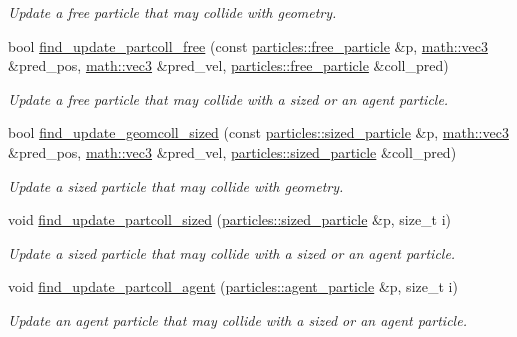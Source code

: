 \begin{DoxyCompactItemize}
\begin{DoxyCompactList}\small\item\em Update a free particle that may collide with geometry. \end{DoxyCompactList}\item 
bool \hyperlink{classphysim_1_1simulator_a228598663672e0a7cfb025ea5c6b9235}{find\+\_\+update\+\_\+partcoll\+\_\+free} (const \hyperlink{classphysim_1_1particles_1_1free__particle}{particles\+::free\+\_\+particle} \&p, \hyperlink{structphysim_1_1math_1_1vec3}{math\+::vec3} \&pred\+\_\+pos, \hyperlink{structphysim_1_1math_1_1vec3}{math\+::vec3} \&pred\+\_\+vel, \hyperlink{classphysim_1_1particles_1_1free__particle}{particles\+::free\+\_\+particle} \&coll\+\_\+pred)
\begin{DoxyCompactList}\small\item\em Update a free particle that may collide with a sized or an agent particle. \end{DoxyCompactList}\item 
bool \hyperlink{classphysim_1_1simulator_a4f982c557113ed7e810efb9e1ff0f838}{find\+\_\+update\+\_\+geomcoll\+\_\+sized} (const \hyperlink{classphysim_1_1particles_1_1sized__particle}{particles\+::sized\+\_\+particle} \&p, \hyperlink{structphysim_1_1math_1_1vec3}{math\+::vec3} \&pred\+\_\+pos, \hyperlink{structphysim_1_1math_1_1vec3}{math\+::vec3} \&pred\+\_\+vel, \hyperlink{classphysim_1_1particles_1_1sized__particle}{particles\+::sized\+\_\+particle} \&coll\+\_\+pred)
\begin{DoxyCompactList}\small\item\em Update a sized particle that may collide with geometry. \end{DoxyCompactList}\item 
void \hyperlink{classphysim_1_1simulator_a5505bc29690fe424e87415ba97a159bc}{find\+\_\+update\+\_\+partcoll\+\_\+sized} (\hyperlink{classphysim_1_1particles_1_1sized__particle}{particles\+::sized\+\_\+particle} \&p, size\+\_\+t i)
\begin{DoxyCompactList}\small\item\em Update a sized particle that may collide with a sized or an agent particle. \end{DoxyCompactList}\item 
void \hyperlink{classphysim_1_1simulator_ae30accaea01fe716e0d51e6766fe44b6}{find\+\_\+update\+\_\+partcoll\+\_\+agent} (\hyperlink{classphysim_1_1particles_1_1agent__particle}{particles\+::agent\+\_\+particle} \&p, size\+\_\+t i)
\begin{DoxyCompactList}\small\item\em Update an agent particle that may collide with a sized or an agent particle. \end{DoxyCompactList}\end{DoxyCompactItemize}
